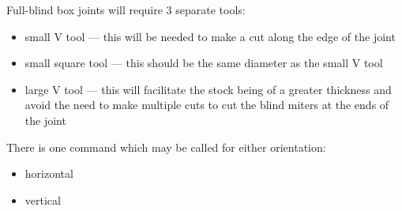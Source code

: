 \documentclass{ltxdoc}
\begin{document}
Full-blind box joints will require 3 separate tools:

\begin{itemize}
\item small V tool --- this will be needed to make a cut along the edge of the joint
\item small square tool --- this should be the same diameter as the small V tool
\item large V tool --- this will facilitate the stock being of a greater thickness and avoid the need to make multiple cuts to cut the blind miters at the ends of the joint
\end{itemize}

There is one command  which may be called for either orientation:

\begin{itemize}
\item horizontal
\item vertical
\end{itemize}
\end{document}
